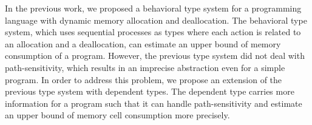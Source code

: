 \label{sec:abstraction}
In the previous work, we proposed a behavioral type system for a
programming language with dynamic memory allocation and deallocation.
The behavioral type system, which uses sequential processes as types
where each action is related to an allocation and a deallocation, can
estimate an upper bound of memory consumption of a program.  However,
the previous type system did not deal with path-sensitivity, which
results in an imprecise abstraction even for a simple program.  In
order to address this problem, we propose an extension of the previous
type system with dependent types.  The dependent type carries more
information for a program such that it can handle path-sensitivity and
estimate an upper bound of memory cell consumption more precisely.  

